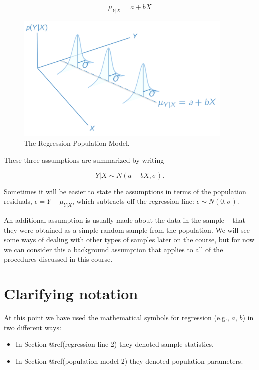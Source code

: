 \documentclass[
  letterpaper,
  DIV=11,
  numbers=noendperiod]{scrreprt}
\providecommand{\tightlist}{%
  \setlength{\itemsep}{0pt}\setlength{\parskip}{0pt}}\usepackage{longtable,booktabs,array}
\begin{document}
\[ \mu_{Y| Χ} = a + bX \]

\begin{figure}

{\centering \includegraphics[width=4.08in,height=\textheight]{files/images/population_model.png}

}

\caption{The Regression Population Model.}

\end{figure}

These three assumptions are summarized by writing

\[ Y|X \sim N(a + bX, \sigma). \]

Sometimes it will be easier to state the assumptions in terms of the
population residuals, \(\epsilon = Y - \mu_{Y|X}\), which subtracts off
the regression line: \(\epsilon \sim N(0, \sigma)\).

An additional assumption is usually made about the data in the sample --
that they were obtained as a simple random sample from the population.
We will see some ways of dealing with other types of samples later on
the course, but for now we can consider this a background assumption
that applies to all of the procedures discussed in this course.

\hypertarget{notation-2}{%
\section{Clarifying notation}\label{notation-2}}

At this point we have used the mathematical symbols for regression
(e.g., \(a\), \(b\)) in two different ways:

\begin{itemize}
\tightlist
\item
  In Section @ref(regression-line-2) they denoted sample statistics.
\item
  In Section @ref(population-model-2) they denoted population
  parameters.
\end{itemize}
\end{document}
